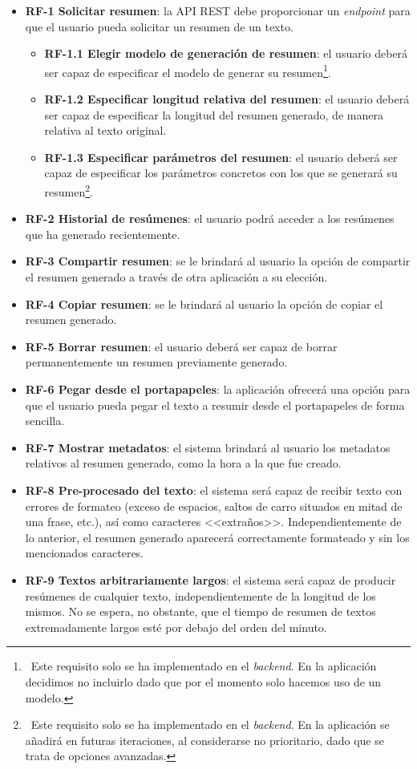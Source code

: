 \begin{itemize}[\textbullet]
	\item \textbf{RF-1 Solicitar resumen}: la API REST debe proporcionar un \emph{endpoint} para que el usuario pueda solicitar un resumen de un texto.
	\begin{itemize}[◦]
		\item \textbf{RF-1.1 Elegir modelo de generación de resumen}: el usuario deberá ser capaz de especificar el modelo de generar su resumen\footnote{\, Este requisito solo se ha implementado en el \emph{backend}. En la aplicación decidimos no incluirlo dado que por el momento solo hacemos uso de un modelo.}.
		\item \textbf{RF-1.2 Especificar longitud relativa del resumen}: el usuario deberá ser capaz de especificar la longitud del resumen generado, de manera relativa al texto original.
		\item \textbf{RF-1.3 Especificar parámetros del resumen}: el usuario deberá ser capaz de especificar los parámetros concretos con los que se generará su resumen\footnote{\, Este requisito solo se ha implementado en el \emph{backend}. En la aplicación se añadirá en futuras iteraciones, al considerarse no prioritario, dado que se trata de opciones avanzadas.}.
	\end{itemize}
	\item \textbf{RF-2 Historial de resúmenes}: el usuario podrá acceder a los resúmenes que ha generado recientemente.
	\item \textbf{RF-3 Compartir resumen}: se le brindará al usuario la opción de compartir el resumen generado a través de otra aplicación a su elección.
	\item \textbf{RF-4 Copiar resumen}: se le brindará al usuario la opción de copiar el resumen generado.
	\item \textbf{RF-5 Borrar resumen}: el usuario deberá ser capaz de borrar permanentemente un resumen previamente generado.
	\item \textbf{RF-6 Pegar desde el portapapeles}: la aplicación ofrecerá una opción para que el usuario pueda pegar el texto a resumir desde el portapapeles de forma sencilla.
	\item \textbf{RF-7 Mostrar metadatos}: el sistema brindará al usuario los metadatos relativos al resumen generado, como la hora a la que fue creado.
	\item \textbf{RF-8 Pre-procesado del texto}: el sistema será capaz de recibir texto con errores de formateo (exceso de espacios, saltos de carro situados en mitad de una frase, etc.), así como caracteres <<extraños>>. Independientemente de lo anterior, el resumen generado aparecerá correctamente formateado y sin los mencionados caracteres.
	\item \textbf{RF-9 Textos arbitrariamente largos}: el sistema será capaz de producir resúmenes de cualquier texto, independientemente de la longitud de los mismos. No se espera, no obstante, que el tiempo de resumen de textos extremadamente largos esté por debajo del orden del minuto.
\end{itemize}

